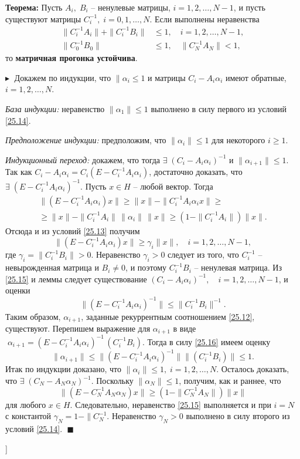 \textbf{Теорема:\;} Пусть $A_i, \; B_i$ -- ненулевые матрицы, $i = 1, 2, \ldots, N-1$, и пусть существуют матрицы $C_i^{-1}, \; i = 0, 1, \ldots, N$. Если выполнены неравенства
\begin{align}
    \label{25.13}
    \|C_i^{-1} A_i\| + \|C_i^{-1} B_i\| &\leq 1, \quad i = 1, 2, \ldots, N-1,\\
    \label{25.14}
    \|C_0^{-1} B_0\| &\leq 1, \quad \|C_N^{-1} A_N\| < 1,
\end{align}
то \textbf{матричная прогонка устойчива}.

$\blacktriangleright\; $ Докажем по индукции, что $\|\alpha_i \leq 1$ и матрицы $C_i - A_i \alpha_i$ имеют обратные, $i = 1, 2, \ldots, N$. 

\textit{База индукции:} неравенство $\|\alpha_1\| \leq 1$ выполнено в силу первого из условий \eqref{25.14}.

\textit{Предположение индукции:} предположим, что $\|\alpha_i\| \leq 1$ для некоторого $i \geq 1$. 

\textit{Индукционный переход:} докажем, что тогда $\exists \; (C_i - A_i \alpha_i)^{-1}$ и $\|\alpha_{i+1}\| \leq 1$. Так как $C_i - A_i \alpha_i = C_i (E - C_i^{-1} A_i \alpha_i)$, достаточно доказать, что $\exists \; (E - C_i^{-1} A_i \alpha_i)^{-1}$. Пусть $x \in H$ -- любой вектор. Тогда 
\begin{multline*}
    \|(E - C_i^{-1} A_i \alpha_i) x\| \geq \|x\| - \| C_i^{-1} A_i \alpha_i x \| \geq \\
    \geq \|x\| -  \| C_i^{-1} A_i\| \,\|\alpha_i\|\,\|x\| \geq (1 - \| C_i^{-1} A_i\|) \|x\|.
\end{multline*}
Отсюда и из условий \eqref{25.13} получим 
\begin{equation}\label{25.15}
     \|(E - C_i^{-1} A_i \alpha_i) x\| \geq \gamma_i \|x\|, \quad i = 1, 2, \ldots, N -1,
\end{equation}
где $\gamma_i = \|C_i^{-1} B_i \| > 0$. Неравенство $\gamma_i > 0$ следует из того, что $C_i^{-1}$ -- невырожденная матрица и $B_i \ne 0$, и поэтому $C_i^{-1} B_i$ -- ненулевая матрица. Из \eqref{25.15} и леммы следует существование $(C_i - A_i \alpha_i)^{-1}, \quad i = 1, 2, \ldots, N-1$, и оценки 
\begin{equation}\label{25.16}
    \|(E - C_i^{-1} A_i \alpha_i)^{-1}\| \leq \|C_i^{-1} B_i\|^{-1}.
\end{equation}
Таким образом, $\alpha_{i+1}$, заданные рекуррентным соотношением \eqref{25.12}, существуют. Перепишем выражение для $\alpha_{i+1}$ в виде $\;\alpha_{i+1} = (E - C^{-1}_i A_i \alpha_i)^{-1} \, (C_i^{-1} B_i)$. Тогда в силу \eqref{25.16} имеем оценку 
$$
\|\alpha_{i+1}\| \leq \|(E - C^{-1}_i A_i \alpha_i)^{-1}\| \|(C_i^{-1} B_i)\| \leq  1.
$$
Итак по индукции доказано, что $\|\alpha_i\| \leq 1, \; i = 1, 2, \ldots, N$. Осталось доказать, что $\exists \; (C_N - A_N \alpha_N)^{-1}$. Поскольку $\|\alpha_N\|\leq 1$, получим, как и раннее, что 
$$
 \|(E - C_N^{-1} A_N \alpha_N) x\| \geq (1 - \|C^{-1}_N A_N\|)\|x\|
$$
для любого $x \in H$. Следовательно, неравенство \eqref{25.15} выполняется и при $i = N$ с константой $\gamma_N = 1 - \|C^{-1}_N$. Неравенство $\gamma_N > 0$ выполнено в силу второго из условий \eqref{25.14}.
$\;\blacksquare$



\bigbreak
[\cite[pages 45-47, 411-418]{chm_samarski_gulin}]